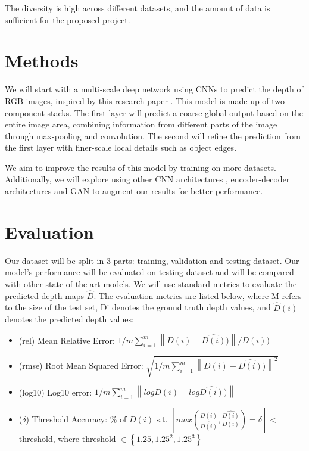 \documentclass{article}
\begin{document}
The diversity is high across different datasets, and the amount of data is sufficient for the proposed project.

\section{ Methods }
We will start with a multi-scale deep network using CNNs to predict the depth of RGB images, inspired by this research paper \cite{nips-1}. This model is made up of two component stacks. The first layer will predict a coarse global output based on the entire image area, combining information from different parts of the image through max-pooling and convolution. The second will refine the prediction from the first layer with finer-scale local details such as object edges. 

We aim to improve the results of this model by training on more datasets. Additionally, we will explore using other CNN architectures \cite{pp1}, encoder-decoder architectures \cite{pp3} and GAN \cite{pp2} to augment our results for better performance.  

\section{Evaluation}
Our dataset will be split in 3 parts: training, validation and testing dataset. Our model’s performance will be evaluated on testing dataset and will be compared with other state of the art models. We will use standard metrics to evaluate the predicted depth maps $\hat{D}$. The evaluation metrics are listed below, where M refers to the size of the test set, Di denotes the ground truth depth values, and $\hat{D}(i)$ denotes the predicted depth values:
\begin{itemize}
\item (rel) Mean Relative Error: $1/m \sum_{i=1}^{m}\left \| D(i) - \hat{D(i)}) \right \| / D(i))$
\item (rmse) Root Mean Squared Error: $\sqrt{1/m \sum_{i=1}^{m}\left \| D(i) - \hat{D(i)}) \right \|^{2}}$
\item (log10) Log10 error: $1/m \sum_{i=1}^{m}\left \| logD(i) - log\hat{D(i)}) \right \|$
\item ($\delta$) Threshold Accuracy: \% of $D(i)$ s.t. $\left [ max( \frac{D(i)}{\hat{D(i)}}, \frac{\hat{D(i)}}{D(i)}) = \delta \right ] < $ threshold, where threshold $\in  \left \{ 1.25, 1.25^{2}, 1.25^{3} \right \}$
\end{itemize}
\end{document}
